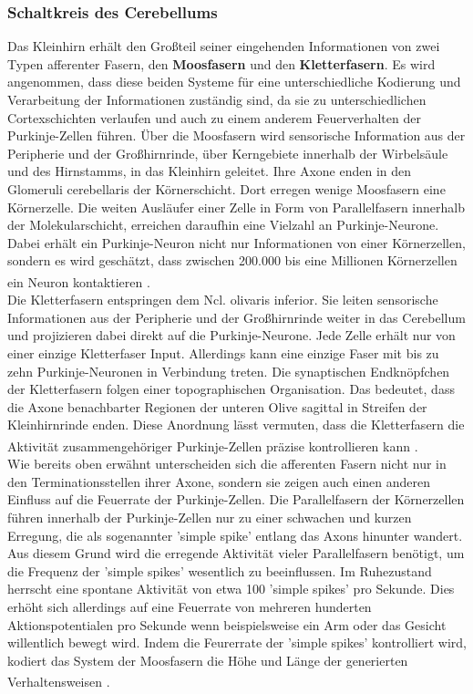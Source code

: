 \subsubsection{Schaltkreis des Cerebellums} \label{subsubsec:kleinhirn_schaltkreis}
Das Kleinhirn erhält den Großteil seiner eingehenden Informationen von zwei Typen afferenter Fasern, den \textbf{Moosfasern} und den \textbf{Kletterfasern}. Es wird angenommen, dass diese beiden Systeme für eine unterschiedliche Kodierung und Verarbeitung der Informationen zuständig sind, da sie zu unterschiedlichen Cortexschichten verlaufen und auch zu einem anderem Feuerverhalten der Purkinje-Zellen führen. Über die Moosfasern wird sensorische Information aus der Peripherie und der Großhirnrinde, über Kerngebiete innerhalb der Wirbelsäule und des Hirnstamms, in das Kleinhirn geleitet. Ihre Axone enden in den Glomeruli cerebellaris der Körnerschicht. Dort erregen wenige Moosfasern eine Körnerzelle. Die weiten Ausläufer einer Zelle in Form von Parallelfasern innerhalb der Molekularschicht, erreichen daraufhin eine Vielzahl an Purkinje-Neurone. Dabei erhält ein Purkinje-Neuron nicht nur Informationen von einer Körnerzellen, sondern es wird geschätzt, dass zwischen 200.000 bis eine Millionen Körnerzellen ein Neuron kontaktieren \textsuperscript{\cite[Kap.~42]{kandel2013principles}}.\\  
Die Kletterfasern entspringen dem Ncl. olivaris inferior. Sie leiten sensorische Informationen aus der Peripherie und der Großhirnrinde weiter in das Cerebellum und projizieren dabei direkt auf die Purkinje-Neurone. Jede Zelle erhält nur von einer einzige Kletterfaser Input. Allerdings kann eine einzige Faser mit bis zu zehn Purkinje-Neuronen in Verbindung treten. Die synaptischen Endknöpfchen der Kletterfasern folgen einer topographischen Organisation. Das bedeutet, dass die Axone benachbarter Regionen der unteren Olive sagittal in Streifen der Kleinhirnrinde enden. Diese Anordnung lässt vermuten, dass die Kletterfasern die Aktivität zusammengehöriger Purkinje-Zellen präzise kontrollieren kann \textsuperscript{\cite[Kap.~42]{kandel2013principles}}.\\         
Wie bereits oben erwähnt unterscheiden sich die afferenten Fasern nicht nur in den Terminationsstellen ihrer Axone, sondern sie zeigen auch einen anderen Einfluss auf die Feuerrate der Purkinje-Zellen. Die Parallelfasern der Körnerzellen führen innerhalb der Purkinje-Zellen nur zu einer schwachen und kurzen Erregung, die als sogenannter 'simple spike' entlang das Axons hinunter wandert. Aus diesem Grund wird die erregende Aktivität vieler Parallelfasern benötigt, um die Frequenz der 'simple spikes' wesentlich zu beeinflussen. Im Ruhezustand herrscht eine spontane Aktivität von etwa 100 'simple spikes' pro Sekunde. Dies erhöht sich allerdings auf eine Feuerrate von mehreren hunderten Aktionspotentialen pro Sekunde wenn beispielsweise ein Arm oder das Gesicht willentlich bewegt wird. Indem die Feurerrate der 'simple spikes' kontrolliert wird, kodiert das System der Moosfasern die Höhe und Länge der generierten Verhaltensweisen \textsuperscript{\cite[Kap.~42]{kandel2013principles}}.\\   
